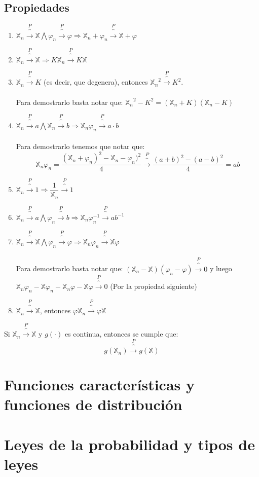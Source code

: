 \documentclass[12pt,a4paper,openright]{book}
\begin{document}
\subsection{Propiedades}
\begin{enumerate}
\item $\mathbb{X}_n\overbrace{\longrightarrow}^P \mathbb{X} \bigwedge \varphi_n\overbrace{\longrightarrow}^P \varphi \Longrightarrow \mathbb{X}_n + \varphi_n\overbrace{\longrightarrow}^P\mathbb{X}+\varphi$
\item $\mathbb{X}_n\overbrace{\longrightarrow}^P \mathbb{X}\Longrightarrow K\mathbb{X}_n\overbrace{\longrightarrow}^P K\mathbb{X}$
\item $\mathbb{X}_n\overbrace{\longrightarrow}^P K$ (es decir, que degenera), entonces ${\mathbb{X}_n}^2\overbrace{\longrightarrow}^P K^2$.\\\\
Para demostrarlo basta notar que: ${\mathbb{X}_n}^2-K^2=(\mathbb{X}_n + K)(\mathbb{X}_n -K)$
\item $\mathbb{X}_n\overbrace{\longrightarrow}^P a \bigwedge \mathbb{X}_n\overbrace{\longrightarrow}^P b\Longrightarrow \mathbb{X}_n \mathbb{\varphi}_n \overbrace{\longrightarrow}^P a\cdot b$
\\\\
Para demostrarlo tenemos que notar que: 
$$\mathbb{X}_n\varphi_n=\dfrac{(\mathbb{X}_n + \varphi_n)^2-\mathbb{X}_n - \varphi_n)^2}{4}\overbrace{\longrightarrow}^P \dfrac{(a+b)^2-(a-b)^2}{4}=ab$$
\item $\mathbb{X}_n\overbrace{\longrightarrow}^P 1 \Longrightarrow \dfrac{1}{\mathbb{X}_n}\overbrace{\longrightarrow}^P 1$
\item $\mathbb{X}_n\overbrace{\longrightarrow}^P a \bigwedge \varphi_n\overbrace{\longrightarrow}^P b\Longrightarrow \mathbb{X}_n\varphi_n^{-1}\overbrace{\longrightarrow}^P ab^{-1}$
\item $\mathbb{X}_n\overbrace{\longrightarrow}^P \mathbb{X}\bigwedge \varphi_n\overbrace{\longrightarrow}^P \varphi \Longrightarrow\mathbb{X}_n\varphi_n\overbrace{\longrightarrow}^P\mathbb{X}\varphi$
\\\\
Para demostrarlo basta notar que: $(\mathbb{X}_n - \mathbb{X})(\varphi_n - \varphi)\overbrace{\longrightarrow}^P 0$ y luego $\mathbb{X}_n\varphi_n-\mathbb{X}\varphi_n-\mathbb{X}_n\varphi-\mathbb{X}\varphi\overbrace{\longrightarrow}^P 0$ (Por la propiedad siguiente)
\item $\mathbb{X}_n\overbrace{\longrightarrow}^P \mathbb{X}$, entonces $\varphi\mathbb{X}_n\overbrace{\longrightarrow}^P \varphi\mathbb{X}$
\end{enumerate}
\begin{theorem}
Si $\mathbb{X}_n\overbrace{\longrightarrow}^P \mathbb{X}$ y $g(\cdot)$ es continua, entonces se cumple que:
$$g(\mathbb{X}_n)\overbrace{\longrightarrow}^P g(\mathbb{X})$$
\end{theorem}
\section{Funciones características y funciones de distribución}
\section{Leyes de la probabilidad y tipos de leyes}
\end{document}
